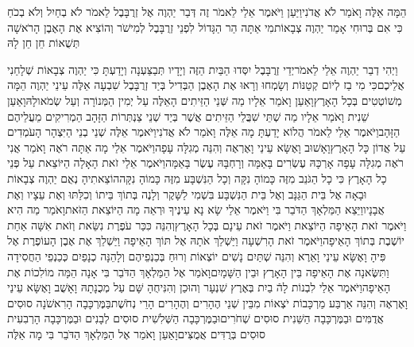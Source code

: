\documentclass[../main/main.tex]{subfiles}
\begin{document}
\begin{multicols*}{\ncols}
הֵמָּה אֵלֶּה וָאֹמַר לֹא אֲדֹנִי\PreVerseSpace{}וַיַּעַן וַיֹּאמֶר אֵלַי לֵאמֹר זֶה דְּבַר יַהְוֶה אֶל זְרֻבָּבֶל לֵאמֹר לֹא בְחַיִל וְלֹא בְכֹחַ כִּי אִם בְּרוּחִי אָמַר יַהְוֶה צְבָאוֹת\PreVerseSpace{}מִי אַתָּה הַר הַגָּדוֹל לִפְנֵי זְרֻבָּבֶל לְמִישֹׁר וְהוֹצִיא אֶת הָאֶבֶן הָרֹאשָׁה תְּשֻׁאוֹת חֵן חֵן לָהּ\OpenSection{}\par
{}וַיְהִי דְבַר יַהְוֶה אֵלַי לֵאמֹר\PreVerseSpace{}יְדֵי זְרֻבָּבֶל יִסְּדוּ הַבַּיִת הַזֶּה וְיָדָיו תְּבַצַּעְנָה וְיָדַעְתָּ כִּי יַהְוֶה צְבָאוֹת שְׁלָחַנִי אֲלֵיכֶם\PreVerseSpace{}כִּי מִי בַז לְיוֹם קְטַנּוֹת וְשָׂמְחוּ וְרָאוּ אֶת הָאֶבֶן הַבְּדִיל בְּיַד זְרֻבָּבֶל שִׁבְעָה אֵלֶּה עֵינֵי יַהְוֶה הֵמָּה מְשׁוֹטְטִים בְּכָל הָאָרֶץ\PreVerseSpace{}וָאַעַן וָאֹמַר אֵלָיו מַה שְּׁנֵי הַזֵּיתִים הָאֵלֶּה עַל יְמִין הַמְּנוֹרָה וְעַל שְׂמֹאולָהּ\PreVerseSpace{}וָאַעַן שֵׁנִית וָאֹמַר אֵלָיו מַה שְׁתֵּי שִׁבֲּלֵי הַזֵּיתִים אֲשֶׁר בְּיַד שְׁנֵי צַנְתְּרוֹת הַזָּהָב הַמְרִיקִים מֵעֲלֵיהֶם הַזָּהָב\PreVerseSpace{}וַיֹּאמֶר אֵלַי לֵאמֹר הֲלוֹא יָדַעְתָּ מָה אֵלֶּה וָאֹמַר לֹא אֲדֹנִי\PreVerseSpace{}וַיֹּאמֶר אֵלֶּה שְׁנֵי בְנֵי הַיִּצְהָר הָעֹמְדִים עַל אֲדוֹן כָּל הָאָרֶץ\PreChapterSpace{}וָאָשׁוּב וָאֶשָּׂא עֵינַי וָאֶרְאֶה וְהִנֵּה מְגִלָּה עָפָה\PreVerseSpace{}וַיֹּאמֶר אֵלַי מָה אַתָּה רֹאֶה וָאֹמַר אֲנִי רֹאֶה מְגִלָּה עָפָה אָרְכָּהּ עֶשְׂרִים בָּאַמָּה וְרָחְבָּהּ עֶשֶׂר בָּאַמָּה\PreVerseSpace{}וַיֹּאמֶר אֵלַי זֹאת הָאָלָה הַיּוֹצֵאת עַל פְּנֵי כָל הָאָרֶץ כִּי כָל הַגֹּנֵב מִזֶּה כָּמוֹהָ נִקָּה וְכָל הַנִּשְׁבָּע מִזֶּה כָּמוֹהָ נִקָּה\PreVerseSpace{}הוֹצֵאתִיהָ נְאֻם יַהְוֶה צְבָאוֹת וּבָאָה אֶל בֵּית הַגַּנָּב וְאֶל בֵּית הַנִּשְׁבָּע בִּשְׁמִי לַשָּׁקֶר וְלָנֶה בְּתוֹךְ בֵּיתוֹ וְכִלַּתּוּ וְאֶת עֵצָיו וְאֶת אֲבָנָיו\PreVerseSpace{}וַיֵּצֵא הַמַּלְאָךְ הַדֹּבֵר בִּי וַיֹּאמֶר אֵלַי שָׂא נָא עֵינֶיךָ וּרְאֵה מָה הַיּוֹצֵאת הַזֹּאת\PreVerseSpace{}וָאֹמַר מַה הִיא וַיֹּאמֶר זֹאת הָאֵיפָה הַיּוֹצֵאת וַיֹּאמֶר זֹאת עֵינָם בְּכָל הָאָרֶץ\PreVerseSpace{}וְהִנֵּה כִּכַּר עֹפֶרֶת נִשֵּׂאת וְזֹאת אִשָּׁה אַחַת יוֹשֶׁבֶת בְּתוֹךְ הָאֵיפָה\PreVerseSpace{}וַיֹּאמֶר זֹאת הָרִשְׁעָה וַיַּשְׁלֵךְ אֹתָהּ אֶל תּוֹךְ הָאֵיפָה וַיַּשְׁלֵךְ אֶת אֶבֶן הָעוֹפֶרֶת אֶל פִּיהָ \ClosedSection{}וָאֶשָּׂא עֵינַי וָאֵרֶא וְהִנֵּה שְׁתַּיִם נָשִׁים יוֹצְאוֹת וְרוּחַ בְּכַנְפֵיהֶם וְלָהֵנָּה כְנָפַיִם כְּכַנְפֵי הַחֲסִידָה וַתִּשֶּׂאנָה אֶת הָאֵיפָה בֵּין הָאָרֶץ וּבֵין הַשָּׁמָיִם\PreVerseSpace{}וָאֹמַר אֶל הַמַּלְאָךְ הַדֹּבֵר בִּי אָנָה הֵמָּה מוֹלִכוֹת אֶת הָאֵיפָה\PreVerseSpace{}וַיֹּאמֶר אֵלַי לִבְנוֹת לָהֿ בַיִת בְּאֶרֶץ שִׁנְעָר וְהוּכַן וְהִנִּיחֻהָ שָּׁם עַל מְכֻנָתָהּ \ClosedSection{}וָאָשֻׁב וָאֶשָּׂא עֵינַי וָאֶרְאֶה וְהִנֵּה אַרְבַּע מַרְכָּבוֹת יֹצְאוֹת מִבֵּין שְׁנֵי הֶהָרִים וְהֶהָרִים הָרֵי נְחֹשֶׁת\PreVerseSpace{}בַּמֶּרְכָּבָה הָרִאשֹׁנָה סוּסִים אֲדֻמִּים וּבַמֶּרְכָּבָה הַשֵּׁנִית סוּסִים שְׁחֹרִים\PreVerseSpace{}וּבַמֶּרְכָּבָה הַשְּׁלִשִׁית סוּסִים לְבָנִים וּבַמֶּרְכָּבָה הָרְבִעִית סוּסִים בְּרֻדִּים אֲמֻצִּים\PreVerseSpace{}וָאַעַן וָאֹמַר אֶל הַמַּלְאָךְ הַדֹּבֵר בִּי מָה אֵלֶּה 
\end{multicols*}
\end{document}
